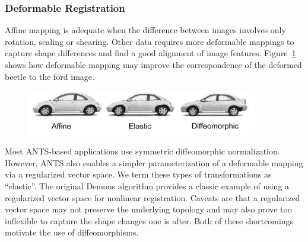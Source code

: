 \documentclass{InsightArticle}
\begin{document}
\subsubsection{Deformable Registration}
Affine mapping is adequate when the
difference between images involves only rotation, scaling or shearing.
Other data requires more deformable mappings to capture shape
differences and find a good alignment of image features.
Figure~\ref{fig:antshier} shows how deformable mapping may improve the
correspondence of the deformed beetle to the ford image.
\begin{figure}
\label{fig:antshier}
\includegraphics[width=0.9\textwidth]{./Figures/ANTSElastToDiff.pdf} 
\vspace{-0.1in}
\end{figure}
Most ANTS-based applications use symmetric diffeomorphic normalization.  However, 
ANTS also enables a simpler parameterization of a deformable mapping via a regularized 
vector space.  We term these types of transformations as ``elastic''.  The original Demons algorithm 
provides a classic example of using a regularized vector space for nonlinear registration.  
Caveats are that a regularized vector space may not preserve the underlying topology 
and may also prove too inflexible to capture the shape changes one is after.  Both of these 
shortcomings motivate the use of diffeomorphisms. 
\end{document}
